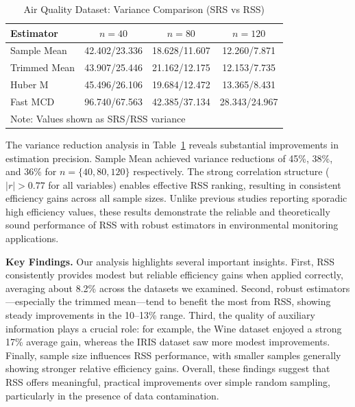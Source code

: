 \documentclass[12pt]{article}
\makeatletter
\let\oldparagraph\paragraph
\renewcommand{\paragraph}{
    \@ifstarcorollary
      \xxxParagraphStar
      \xxxParagraphNoStar
  }
\newcommand{\xxxParagraphStar}[1]{\oldparagraph*{#1}\mbox{}}
\newcommand{\xxxParagraphNoStar}[1]{\oldparagraph{#1}\mbox{}}
\makeatother
\begin{document}
\begin{table}[htbp]
\centering
\caption{Air Quality Dataset: Variance Comparison (SRS vs RSS)}
\label{tab:air_quality_variance}
\begin{tabular}{lccc}
\hline
Estimator & $n=40$ & $n=80$ & $n=120$ \\
\hline
Sample Mean & 42.402/23.336 & 18.628/11.607 & 12.260/7.871 \\
Trimmed Mean & 43.907/25.446 & 21.162/12.175 & 12.153/7.735 \\
Huber M & 45.496/26.106 & 19.684/12.472 & 13.365/8.431 \\
Fast MCD & 96.740/67.563 & 42.385/37.134 & 28.343/24.967 \\
\hline
\multicolumn{4}{l}{\footnotesize Note: Values shown as SRS/RSS variance}
\end{tabular}
\end{table}

The variance reduction analysis in Table~\ref{tab:air_quality_variance} reveals substantial improvements in estimation precision. Sample Mean achieved variance reductions of 45\%, 38\%, and 36\% for $n=\{40,80,120\}$ respectively. The strong correlation structure ($|r| > 0.77$ for all variables) enables effective RSS ranking, resulting in consistent efficiency gains across all sample sizes. Unlike previous studies reporting sporadic high efficiency values, these results demonstrate the reliable and theoretically sound performance of RSS with robust estimators in environmental monitoring applications.

{\bf Key Findings.}
Our analysis highlights several important insights. First, RSS consistently provides modest but reliable efficiency gains when applied correctly, averaging about 8.2\% across the datasets we examined. Second, robust estimators—especially the trimmed mean—tend to benefit the most from RSS, showing steady improvements in the 10–13\% range. Third, the quality of auxiliary information plays a crucial role: for example, the Wine dataset enjoyed a strong 17\% average gain, whereas the IRIS dataset saw more modest improvements. Finally, sample size influences RSS performance, with smaller samples generally showing stronger relative efficiency gains. Overall, these findings suggest that RSS offers meaningful, practical improvements over simple random sampling, particularly in the presence of data contamination.
\end{document}
